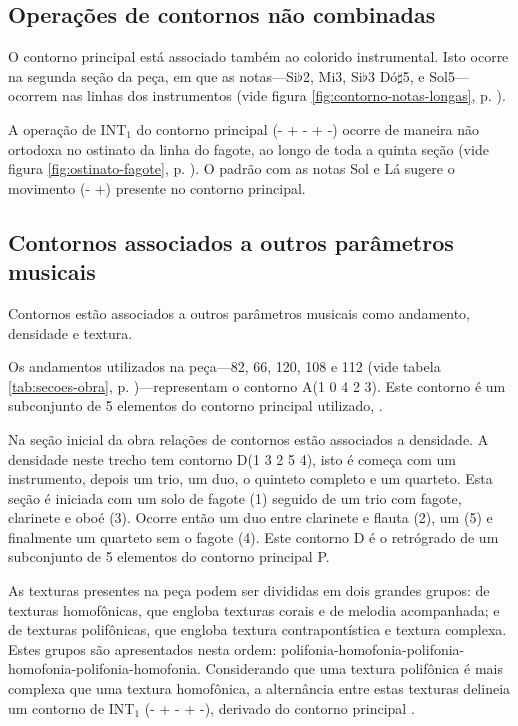 \subsection{Operações de contornos não combinadas}
\label{sec:cont-nao-comb}

O contorno principal \contpr{} está associado também ao colorido
instrumental. Isto ocorre na segunda seção da peça, em que as
notas---Si$\flat$2, Mi3, Si$\flat$3 Dó$\sharp$5, e Sol5---ocorrem nas
linhas dos instrumentos (vide figura \ref{fig:contorno-notas-longas},
p. \pageref{fig:contorno-notas-longas}).

A operação de INT$_1$ do contorno principal (- + - + -) ocorre de
maneira não ortodoxa no ostinato da linha do fagote, ao longo de toda
a quinta seção (vide figura \ref{fig:ostinato-fagote},
p. \pageref{fig:ostinato-fagote}). O padrão com as notas Sol e Lá
sugere o movimento (- +) presente no contorno principal.


\subsection{Contornos associados a outros parâmetros musicais}
\label{sec:cont-assoc-outr}

Contornos estão associados a outros parâmetros musicais como
andamento, densidade e textura.

Os andamentos utilizados na peça---82, 66, 120, 108 e 112 (vide tabela
\ref{tab:secoes-obra}, p. \pageref{tab:secoes-obra})---representam o
contorno A(1 0 4 2 3). Este contorno é um subconjunto de 5 elementos
do contorno principal utilizado, \contpr{}.

Na seção inicial da obra relações de contornos estão associados a
densidade. A densidade neste trecho tem contorno D(1 3 2 5 4), isto é
começa com um instrumento, depois um trio, um duo, o quinteto completo
e um quarteto. Esta seção é iniciada com um solo de fagote (1) seguido
de um trio com fagote, clarinete e oboé (3). Ocorre então um duo entre
clarinete e flauta (2), um  (5) e finalmente um quarteto
sem o fagote (4). Este contorno D é o retrógrado de um subconjunto de
5 elementos do contorno principal P.

As texturas presentes na peça podem ser divididas em dois grandes
grupos: de texturas homofônicas, que engloba texturas corais e de
melodia acompanhada; e de texturas polifônicas, que engloba textura
contrapontística e textura complexa. Estes grupos são apresentados
nesta ordem:
polifonia-homofonia-polifonia-homofonia-polifonia-homofonia. Considerando
que uma textura polifônica é mais complexa que uma textura homofônica,
a alternância entre estas texturas delineia um contorno de INT$_1$ (-
+ - + -), derivado do contorno principal \contpr{}.

